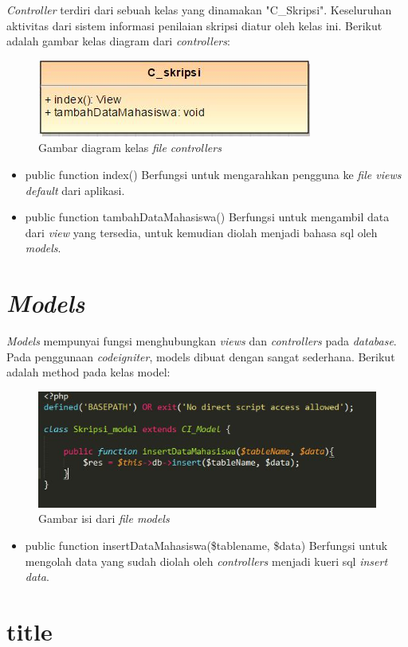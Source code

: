 	\textit{Controller} terdiri dari sebuah kelas yang dinamakan "C\_Skripsi". Keseluruhan aktivitas dari sistem informasi penilaian skripsi diatur oleh kelas ini. Berikut adalah gambar kelas diagram dari \textit{controllers}:
	\begin{figure}[H]
		\centering
		\includegraphics[scale= 1.0]{Gambar/C_skripsi}
		\caption {Gambar diagram kelas \textit{file controllers}}
		\label{fig:controllers}
	\end{figure}
	
	\begin{itemize}
		\item public function index()
		Berfungsi untuk mengarahkan pengguna ke \textit{file views default} dari aplikasi.
		\item public function tambahDataMahasiswa()
		Berfungsi untuk mengambil data dari \textit{view} yang tersedia, untuk kemudian diolah menjadi bahasa sql oleh \textit{models}.
	\end{itemize}
	
	\section{\textit{Models}}
	\label{sec: models}
	
	\textit{Models} mempunyai fungsi menghubungkan \textit{views} dan \textit{controllers} pada \textit{database}. Pada penggunaan \textit{codeigniter}, models dibuat dengan sangat sederhana. Berikut adalah method pada kelas model:
	\begin{figure}[H]
		\centering
		\includegraphics[scale= 1.0]{Gambar/models}
		\caption {Gambar isi dari \textit{file models}}
		\label{fig:models}
	\end{figure}
	\begin{itemize}
		\item public function insertDataMahasiswa(\$tablename, \$data)
		Berfungsi untuk mengolah data yang sudah diolah oleh \textit{controllers} menjadi kueri sql \textit{insert data}.
	\end{itemize}
	
	\section{title}